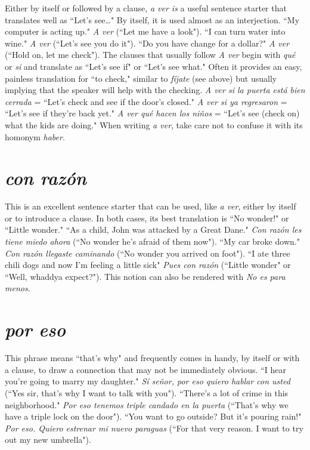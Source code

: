 Either by itself or followed by a clause, \emph{a ver is} a useful sentence starter that translates well as ``Let's see\ldots{}" By itself, it is used
almost as an interjection. ``My computer is acting up." \emph{A ver} (``Let
me have a look"). ``I can turn water into wine." \emph{A ver} (``Let's see you
do it"). ``Do you have change for a dollar?" \emph{A ver} (``Hold on, let me
check"). The clauses that usually follow \emph{A ver} begin with \emph{qué} or \emph{si}
and translate as ``Let's see if" or ``Let's see what." Often it provides an
easy, painless translation for ``to check," similar to \emph{fíjate} (see above)
but usually implying that the speaker will help with the checking. \emph{A
ver si la puerta está bien cerrada} = ``Let's check and see if the door's
closed." \emph{A ver si ya regresaron} = ``Let's see if they're back yet." \emph{A
ver qué hacen los niños} = ``Let's see (check on) what the kids are doing." When writing \emph{a ver}, take care not to confuse it with its homonym
\emph{haber}.

\section{\emph{con razón}}

This is an excellent sentence starter that can be used, like
\emph{a ver}, either by itself or to introduce a clause. In both cases, its best
translation is ``No wonder!" or ``Little wonder." ``As a child, John was
attacked by a Great Dane." \emph{Con razón les tiene miedo ahora} (``No
wonder he's afraid of them now"). ``My car broke down." \emph{Con razón
llegaste caminando} (``No wonder you arrived on foot"). ``I ate three
chili dogs and now I'm feeling a little sick" \emph{Pues con razón} (``Little
wonder" or ``Well, whaddya expect?"). This notion can also be rendered
with \emph{No es para menos}.

\section{\emph{por eso}}

This phrase means ``that's why" and frequently comes in
handy, by itself or with a clause, to draw a connection that may not be
immediately obvious. ``I hear you're going to marry my daughter." \emph{Sí
señor, por eso quiero hablar con usted} (``Yes sir, that's why I want to
talk with you"). ``There's a lot of crime in this neighborhood." \emph{Por eso
tenemos triple candado en la puerta} (``That's why we have a triple
lock on the door"). ``You want to go outside? But it's pouring rain!" \emph{Por
eso. Quiero estrenar mi nuevo paraguas} (``For that very reason. I want
to try out my new umbrella").

